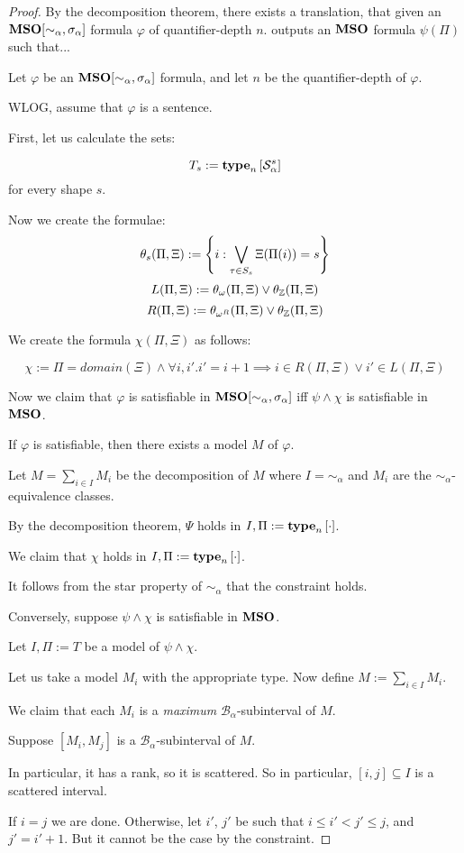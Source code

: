 \begin{proof}
  By the decomposition theorem, there exists a translation,
  that given an $\mathbf{MSO}[\sim_{\alpha}, \sigma_{\alpha}]$ formula $\varphi$ of quantifier-depth $n$.
  outputs an $\mathbf{MSO}$ formula $\psi(\Pi)$ such that...

  Let $\varphi$ be an $\mathbf{MSO}[\sim_{\alpha}, \sigma_{\alpha}]$ formula,
  and let $n$ be the quantifier-depth of $\varphi$.

  WLOG, assume that $\varphi$ is a sentence.

  First, let us calculate the sets:
  
  $$T_s := \mathbf{type}_{n} \left[ {\mathcal{S}^{s}_{\alpha}} \right]$$
  for every shape $s$.

  Now we create the formulae:
  $$\theta_s(\Pi, \Xi) := \left\{ {i : \bigvee_{\tau \in S_s}{\Xi(\Pi(i)) = s}} \right\}$$
  $$L(\Pi, \Xi) := \theta_{\omega}(\Pi, \Xi) \vee \theta_{\mathbb{Z}}(\Pi, \Xi)$$
  $$R(\Pi, \Xi) := \theta_{\omega^R}(\Pi, \Xi) \vee \theta_{\mathbb{Z}}(\Pi, \Xi)$$

  We create the formula $\chi(\Pi, \Xi)$ as follows:

  $$\chi := \Pi = domain(\Xi) \wedge \forall i, i'. i' = i + 1 \implies {i \in R(\Pi, \Xi) \vee i' \in L(\Pi, \Xi)}$$

  Now we claim that $\varphi$ is satisfiable in $\mathbf{MSO}[\sim_{\alpha}, \sigma_{\alpha}]$
  iff $\psi \land \chi$ is satisfiable in $\mathbf{MSO}$.

  If $\varphi$ is satisfiable, then there exists a model $M$ of $\varphi$.

  Let $M = \sum_{i \in I} M_i$ be the decomposition of $M$
  where $I = \sim_{\alpha}$ and $M_i$ are the $\sim_{\alpha}$-equivalence classes.

  By the decomposition theorem, $\Psi$ holds
  in $I, \Pi := \mathbf{type}_{n} \left[ {\cdot} \right]$.

  We claim that $\chi$ holds in $I, \Pi := \mathbf{type}_{n} \left[ {\cdot} \right]$. 
  
  It follows from the star property of $\sim_{\alpha}$ that the constraint holds.

  Conversely, suppose $\psi \land \chi$ is satisfiable in $\mathbf{MSO}$.

  Let $I, \Pi := T$ be a model of $\psi \land \chi$.

  Let us take a model $M_i$ with the appropriate type.
  Now define $M := \sum_{i \in I} M_i$.

  We claim that each $M_i$ is a \emph{maximum} $\mathcal{B}_{\alpha}$-subinterval
  of $M$.

  Suppose $[M_i, M_j]$ is a $\mathcal{B}_{\alpha}$-subinterval of $M$.
  
  In particular, it has a rank, so it is scattered. So in particular,
  $[i, j] \subseteq I$ is a scattered interval.

  If $i = j$ we are done. Otherwise, let $i'$, $j'$ be such that $i \le i' < j' \le j$,
  and $j' = i' + 1$.  But it cannot be the case by the constraint.


\end{proof}

